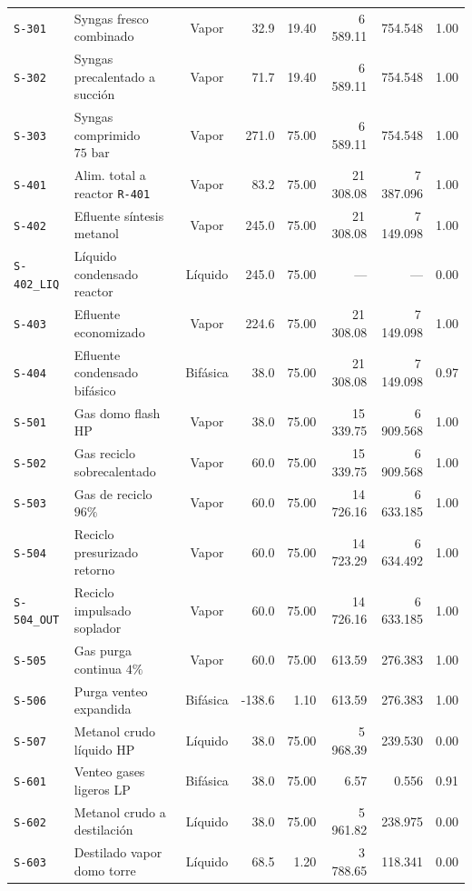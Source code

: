\documentclass[10pt,letterpaper]{article}
\begin{document}
\begin{xltabular}{\textwidth}{l >{\raggedright\arraybackslash}X c r r r r c}
\texttt{S-301} & Syngas fresco combinado & Vapor & 32.9 & 19.40 & 6\,589.11 & 754.548 & 1.00 \\
\texttt{S-302} & Syngas precalentado a succión & Vapor & 71.7 & 19.40 & 6\,589.11 & 754.548 & 1.00 \\
\texttt{S-303} & Syngas comprimido $75\text{ bar}$ & Vapor & 271.0 & 75.00 & 6\,589.11 & 754.548 & 1.00 \\
\texttt{S-401} & Alim. total a reactor \texttt{R-401} & Vapor & 83.2 & 75.00 & 21\,308.08 & 7\,387.096 & 1.00 \\
\texttt{S-402} & Efluente síntesis metanol & Vapor & 245.0 & 75.00 & 21\,308.08 & 7\,149.098 & 1.00 \\
\texttt{S-402\_LIQ} & Líquido condensado reactor & Líquido & 245.0 & 75.00 & --- & --- & 0.00 \\
\texttt{S-403} & Efluente economizado & Vapor & 224.6 & 75.00 & 21\,308.08 & 7\,149.098 & 1.00 \\
\texttt{S-404} & Efluente condensado bifásico & Bifásica & 38.0 & 75.00 & 21\,308.08 & 7\,149.098 & 0.97 \\
\texttt{S-501} & Gas domo flash HP & Vapor & 38.0 & 75.00 & 15\,339.75 & 6\,909.568 & 1.00 \\
\texttt{S-502} & Gas reciclo sobrecalentado & Vapor & 60.0 & 75.00 & 15\,339.75 & 6\,909.568 & 1.00 \\
\texttt{S-503} & Gas de reciclo $96\%$ & Vapor & 60.0 & 75.00 & 14\,726.16 & 6\,633.185 & 1.00 \\
\texttt{S-504} & Reciclo presurizado retorno & Vapor & 60.0 & 75.00 & 14\,723.29 & 6\,634.492 & 1.00 \\
\texttt{S-504\_OUT} & Reciclo impulsado soplador & Vapor & 60.0 & 75.00 & 14\,726.16 & 6\,633.185 & 1.00 \\
\texttt{S-505} & Gas purga continua $4\%$ & Vapor & 60.0 & 75.00 & 613.59 & 276.383 & 1.00 \\
\texttt{S-506} & Purga venteo expandida & Bifásica & -138.6 & 1.10 & 613.59 & 276.383 & 1.00 \\
\texttt{S-507} & Metanol crudo líquido HP & Líquido & 38.0 & 75.00 & 5\,968.39 & 239.530 & 0.00 \\
\texttt{S-601} & Venteo gases ligeros LP & Bifásica & 38.0 & 75.00 & 6.57 & 0.556 & 0.91 \\
\texttt{S-602} & Metanol crudo a destilación & Líquido & 38.0 & 75.00 & 5\,961.82 & 238.975 & 0.00 \\
\texttt{S-603} & Destilado vapor domo torre & Líquido & 68.5 & 1.20 & 3\,788.65 & 118.341 & 0.00 \\

\end{xltabular}
\end{document}
